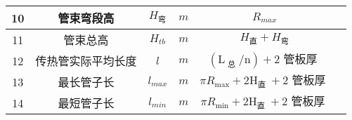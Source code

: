 \begin{table}[H]
{\begin{tabular}{|c|c|c|c|c|c|}
            10   & 管束弯段高         & $ H_{\text{弯}} $ & $ m $ & $ R_{max} $                                                     &      \\ \hline
            11   & 管束总高           & $ H_{tb} $        & $ m $ & $ H_{\text{直}} + H_{\text{弯}} $                               &      \\ \hline
            12   & 传热管实际平均长度 & $ l $             & $ m $ & $ (\mathrm{L}_\text { 总 } / \mathrm{n})+2 \text { 管板厚 } $   &      \\ \hline
            13   & 最长管子长         & $ l_{max} $       & $ m $ & $ \pi R_{\max }+2 \mathrm{H}_{\text {直 }}+2 \text { 管板厚 } $ &      \\ \hline
            14   & 最短管子长         & $ l_{min} $       & $ m $ & $ \pi R_{\min }+2 \mathrm{H}_{\text {直 }}+2 \text { 管板厚 } $ &      \\ \hline
        \end{tabular}
    }
\end{table}


